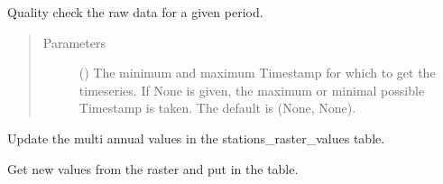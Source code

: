 \documentclass[letterpaper,10pt,english]{sphinxmanual}
\begin{document}
\begin{fulllineitems}
\begin{fulllineitems}
\label{\detokenize{weatherDB:weatherDB.station.StationBase.quality_check}}
\sphinxAtStartPar
Quality check the raw data for a given period.
\begin{quote}\begin{description}
\item[{Parameters}] \leavevmode
\sphinxAtStartPar
{} (\sphinxstyleliteralemphasis{\sphinxupquote{(}}\sphinxstyleliteralemphasis{\sphinxupquote{)}}\sphinxstyleliteralemphasis{\sphinxupquote{, }}) \textendash{} The minimum and maximum Timestamp for which to get the timeseries.
If None is given, the maximum or minimal possible Timestamp is taken.
The default is (None, None).

\end{description}\end{quote}

\end{fulllineitems}


\begin{fulllineitems}
\label{\detokenize{weatherDB:weatherDB.station.StationBase.update_ma}}
\sphinxAtStartPar
Update the multi annual values in the stations\_raster\_values table.

\sphinxAtStartPar
Get new values from the raster and put in the table.

\end{fulllineitems}



\end{fulllineitems}
\end{document}
